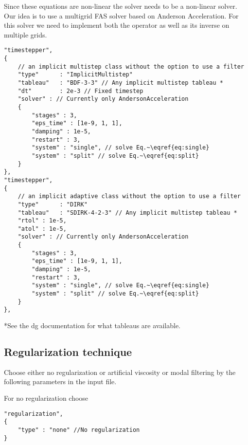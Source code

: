 Since these equations are non-linear the solver needs to be a non-linear solver. Our idea is to use a multigrid FAS solver based on Anderson Acceleration. For this solver we need to implement both the operator as well as its inverse on multiple grids.
\begin{verbatim}
"timestepper",
{
    // an implicit multistep class without the option to use a filter
    "type"      : "ImplicitMultistep"
    "tableau"   : "BDF-3-3" // Any implicit multistep tableau *
    "dt"        : 2e-3 // Fixed timestep
    "solver" : // Currently only AndersonAcceleration
    {
        "stages" : 3,
        "eps_time" : [1e-9, 1, 1],
        "damping" : 1e-5,
        "restart" : 3,
        "system" : "single", // solve Eq.~\eqref{eq:single}
        "system" : "split" // solve Eq.~\eqref{eq:split}
    }
},
"timestepper",
{
    // an implicit adaptive class without the option to use a filter
    "type"      : "DIRK"
    "tableau"   : "SDIRK-4-2-3" // Any implicit multistep tableau *
    "rtol" : 1e-5,
    "atol" : 1e-5,
    "solver" : // Currently only AndersonAcceleration
    {
        "stages" : 3,
        "eps_time" : [1e-9, 1, 1],
        "damping" : 1e-5,
        "restart" : 3,
        "system" : "single", // solve Eq.~\eqref{eq:single}
        "system" : "split" // solve Eq.~\eqref{eq:split}
    }
},
\end{verbatim}
*See the dg documentation for what tableaus are available.
\subsection{Regularization technique}
Choose either no regularization or artificial viscosity or modal filtering by the following
parameters in the input file.

For no regularization choose
\begin{verbatim}
"regularization",
{
    "type" : "none" //No regularization
}
\end{verbatim}

